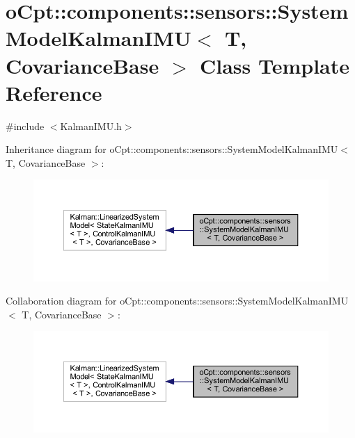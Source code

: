 \hypertarget{classo_cpt_1_1components_1_1sensors_1_1_system_model_kalman_i_m_u}{}\section{o\+Cpt\+:\+:components\+:\+:sensors\+:\+:System\+Model\+Kalman\+I\+MU$<$ T, Covariance\+Base $>$ Class Template Reference}
\label{classo_cpt_1_1components_1_1sensors_1_1_system_model_kalman_i_m_u}


{\ttfamily \#include $<$Kalman\+I\+M\+U.\+h$>$}



Inheritance diagram for o\+Cpt\+:\+:components\+:\+:sensors\+:\+:System\+Model\+Kalman\+I\+MU$<$ T, Covariance\+Base $>$\+:
\nopagebreak
\begin{figure}[H]
\begin{center}
\leavevmode
\includegraphics[width=350pt]{classo_cpt_1_1components_1_1sensors_1_1_system_model_kalman_i_m_u__inherit__graph}
\end{center}
\end{figure}


Collaboration diagram for o\+Cpt\+:\+:components\+:\+:sensors\+:\+:System\+Model\+Kalman\+I\+MU$<$ T, Covariance\+Base $>$\+:
\nopagebreak
\begin{figure}[H]
\begin{center}
\leavevmode
\includegraphics[width=350pt]{classo_cpt_1_1components_1_1sensors_1_1_system_model_kalman_i_m_u__coll__graph}
\end{center}
\end{figure}
